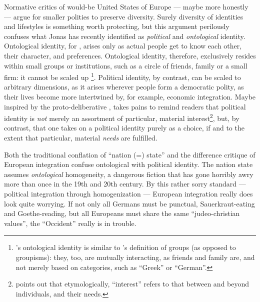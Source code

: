 Normative critics of would-be United States of Europe --- maybe more honestly --- argue for smaller polities to preserve diversity.
Surely diversity of identities and lifestyles is something worth protecting, but this argument perilously confuses what Jonas \cite{Marx2012} has recently identified as \emph{political} and \emph{ontological} identity.
Ontological identity, for \citeauthor{Marx2012}, arises only as actual people get to know each other, their character, and preferences.
Ontological identity, therefore, exclusively resides within small groups or institutions, such as a circle of friends, family or a small firm:
it cannot be scaled up
\footnote{
	\cite{Marx2012}'s ontological identity is similar to \cite{Brubaker-2002-aa}'s definition of groups (as opposed to groupisms):
	they, too, are mutually interacting, as friends and family are, and not merely based on categories, such as ``Greek'' or ``German''.
}.
Political identity, by contrast, can be scaled to arbitrary dimensions, as it arises wherever people form a democratic polity, as their lives become more intertwined by, for example, economic integration.
Maybe inspired by the proto-deliberative \cite{Arendt1958}, \citeauthor{Marx2012} takes pains to remind readers that political identity is \emph{not} merely an assortment of particular, material interest\footnote{
	\citeauthor{Marx2012} points out that etymologically, ``interest'' refers to that between and beyond individuals, and their needs.},
but, by contrast, that one takes on a political identity purely as a choice, if and to the extent that particular, material \emph{needs} are fulfilled.

Both the traditional conflation of ``nation (=) state'' and the difference critique of European integration confuse ontological with political identity.
The nation state assumes \emph{ontological} homogeneity, a dangerous fiction that has gone horribly awry more than once in the 19th and 20th century.
By this rather sorry standard --- political integration through homogenization --- European integration really does look quite worrying.
If not only all Germans must be punctual, Sauerkraut-eating and Goethe-reading, but all Europeans must share the same ``judeo-christian values'', the ``Occident'' really is in trouble.

